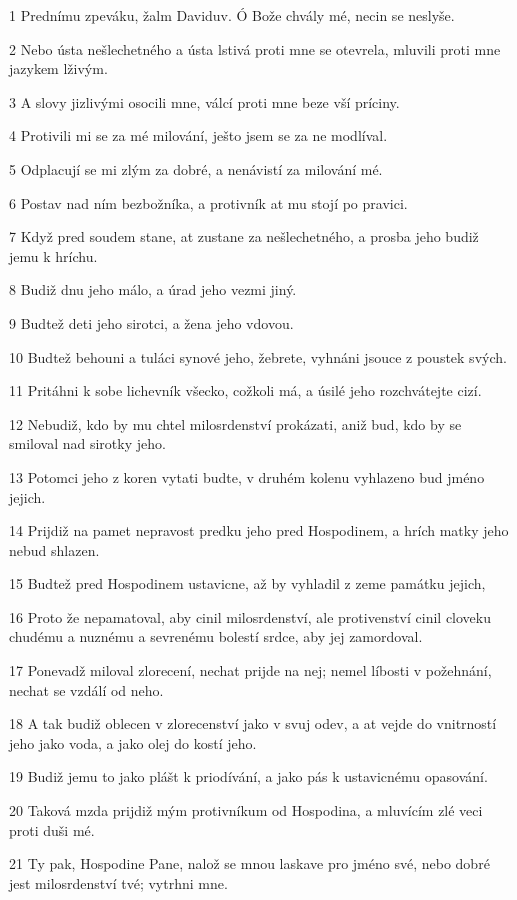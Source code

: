 \par 1 Prednímu zpeváku, žalm Daviduv. Ó Bože chvály mé, necin se neslyše.
\par 2 Nebo ústa nešlechetného a ústa lstivá proti mne se otevrela, mluvili proti mne jazykem lživým.
\par 3 A slovy jizlivými osocili mne, válcí proti mne beze vší príciny.
\par 4 Protivili mi se za mé milování, ješto jsem se za ne modlíval.
\par 5 Odplacují se mi zlým za dobré, a nenávistí za milování mé.
\par 6 Postav nad ním bezbožníka, a protivník at mu stojí po pravici.
\par 7 Když pred soudem stane, at zustane za nešlechetného, a prosba jeho budiž jemu k hríchu.
\par 8 Budiž dnu jeho málo, a úrad jeho vezmi jiný.
\par 9 Budtež deti jeho sirotci, a žena jeho vdovou.
\par 10 Budtež behouni a tuláci synové jeho, žebrete, vyhnáni jsouce z poustek svých.
\par 11 Pritáhni k sobe lichevník všecko, cožkoli má, a úsilé jeho rozchvátejte cizí.
\par 12 Nebudiž, kdo by mu chtel milosrdenství prokázati, aniž bud, kdo by se smiloval nad sirotky jeho.
\par 13 Potomci jeho z koren vytati budte, v druhém kolenu vyhlazeno bud jméno jejich.
\par 14 Prijdiž na pamet nepravost predku jeho pred Hospodinem, a hrích matky jeho nebud shlazen.
\par 15 Budtež pred Hospodinem ustavicne, až by vyhladil z zeme památku jejich,
\par 16 Proto že nepamatoval, aby cinil milosrdenství, ale protivenství cinil cloveku chudému a nuznému a sevrenému bolestí srdce, aby jej zamordoval.
\par 17 Ponevadž miloval zlorecení, nechat prijde na nej; nemel líbosti v požehnání, nechat se vzdálí od neho.
\par 18 A tak budiž oblecen v zlorecenství jako v svuj odev, a at vejde do vnitrností jeho jako voda, a jako olej do kostí jeho.
\par 19 Budiž jemu to jako plášt k priodívání, a jako pás k ustavicnému opasování.
\par 20 Taková mzda prijdiž mým protivníkum od Hospodina, a mluvícím zlé veci proti duši mé.
\par 21 Ty pak, Hospodine Pane, nalož se mnou laskave pro jméno své, nebo dobré jest milosrdenství tvé; vytrhni mne.
